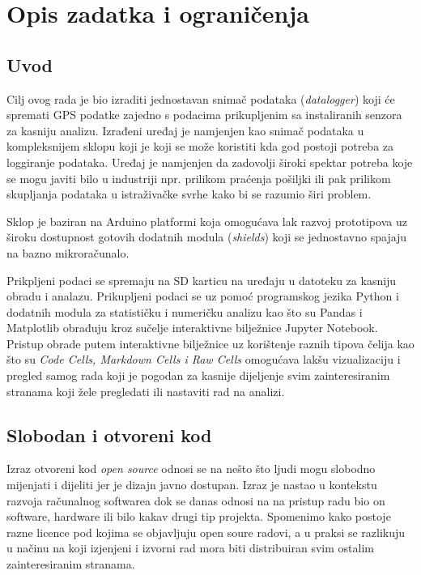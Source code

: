 \chapter{Opis zadatka i ograničenja}\label{OpisIOgranicenja}
\section{Uvod}
Cilj ovog rada je bio izraditi jednostavan snimač podataka (\textit{datalogger}) koji će spremati GPS podatke zajedno s podacima prikupljenim sa instaliranih senzora za kasniju analizu.
Izrađeni uređaj je namjenjen kao snimač podataka u kompleksnijem sklopu koji je koji se može koristiti kda god postoji potreba za loggiranje podataka.
Uređaj je namjenjen da zadovolji široki spektar potreba koje se mogu javiti bilo u industriji npr. prilikom praćenja pošiljki ili pak prilikom skupljanja podataka u istraživačke svrhe kako bi se razumio širi problem.

Sklop je baziran na Arduino platformi koja omogućava lak razvoj prototipova uz široku dostupnost gotovih dodatnih modula (\textit{shields}) koji se jednostavno spajaju na bazno mikroračunalo.

Prikpljeni podaci se spremaju na SD karticu na uređaju u datoteku za kasniju obradu i analazu.
Prikupljeni podaci se uz pomoć programskog jezika Python i dodatnih modula za statističku i numeričku analizu kao što su Pandas i Matplotlib obrađuju kroz sučelje interaktivne bilježnice Jupyter Notebook.
Pristup obrade putem interaktivne bilježnice uz korištenje raznih tipova čelija kao što su \textit{Code Cells, Markdown Cells i Raw Cells} omogućava lakšu vizualizaciju i pregled samog rada koji je pogodan za kasnije dijeljenje svim zainteresiranim stranama koji žele pregledati ili nastaviti rad na analizi.

\section{Slobodan i otvoreni kod}
Izraz otvoreni kod \textit{open source} odnosi se na nešto što ljudi mogu slobodno mijenjati i dijeliti jer je dizajn javno dostupan\cite{WhatIsOpenSource}.
Izraz je nastao u kontekstu razvoja računalnog softwarea dok se danas odnosi na na pristup radu bio on software, hardware ili bilo kakav drugi tip projekta.
Spomenimo kako postoje razne licence pod kojima se objavljuju open soure radovi, a u praksi se razlikuju u načinu na koji izjenjeni i izvorni rad mora biti distribuiran svim ostalim zainteresiranim stranama.

